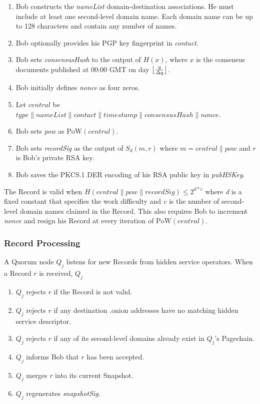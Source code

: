 \documentclass{sig-alternate}
\DeclarePairedDelimiter{\floor}{\lfloor}{\rfloor}
\newcommand*\concat{\mathbin{\|}}
\begin{document}
\begin{enumerate}
	\item Bob constructs the \emph{nameList} domain-destination associations. He must include at least one second-level domain name. Each domain name can be up to 128 characters and contain any number of names.
	\item Bob optionally provides his PGP key fingerprint in \emph{contact}.
	\item Bob sets \emph{consensusHash} to the output of $ H(x) $, where $ x $ is the consensus documents published at 00:00 GMT on day $ \floor[\big]{\frac{q}{\Delta q}} $.
	\item Bob initially defines \emph{nonce} as four zeros.
	\item Let $ \mathit{central} $ be $\mathit{type} \concat \mathit{nameList} \concat \mathit{contact} \concat \mathit{timestamp} \concat \mathit{consensusHash} \concat \mathit{nonce} $.
	\item Bob sets \emph{pow} as $ \mathrm{PoW}(\mathit{central}) $.
	\item Bob sets \emph{recordSig} as the output of $ S_{d}(m, r) $ where $ m = \mathit{central} \concat \mathit{pow} $ and $ r $ is Bob's private RSA key.
	\item Bob saves the PKCS.1 DER encoding of his RSA public key in \emph{pubHSKey}.
\end{enumerate}

The Record is valid when $ H(\mathit{central} \concat \mathit{pow} \concat \mathit{recordSig}) \leq 2^{\mathit{d} * \mathit{c}} $ where \emph{d} is a fixed constant that specifies the work difficulty and \emph{c} is the number of second-level domain names claimed in the Record. This also requires Bob to increment \emph{nonce} and resign his Record at every iteration of $ \mathrm{PoW}(\mathit{central}) $.

\subsubsection{Record Processing}

A Quorum node $ Q_{j} $ listens for new Records from hidden service operators. When a Record $ r $ is received, $ Q_{j} $

\begin{enumerate}
	\item $ Q_{j} $ rejects $ r $ if the Record is not valid.
	\item $ Q_{j} $ rejects $ r $ if any destination .onion addresses have no matching hidden service descriptor.
	\item $ Q_{j} $ rejects $ r $ if any of its second-level domains already exist in $ Q_{j} $'s Pagechain.
	\item $ Q_{j} $ informs Bob that $ r $ has been accepted.
	\item $ Q_{j} $ merges $ r $ into its current Snapshot.
	\item $ Q_{j} $ regenerates \emph{snapshotSig}.
\end{enumerate}
\end{document}
